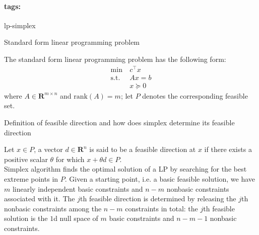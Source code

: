 \documentclass[11pt]{article}
\newcommand{\reals}{\mathbf{R}}
\newcommand*{\tags}[1]{\paragraph{tags: }#1\bigskip}
\newcommand*{\xfield}[1]{\begin{mdframed}\centering #1\end{mdframed}\bigskip}
\newenvironment{field}{}{}
\newenvironment{note}{}{}
\begin{document}
\tags{lp-simplex}
\begin{note}
  \xfield{Standard form linear programming problem}
  \begin{field}
    The standard form linear programming problem has the following
    form:
    \begin{align*}
      \min ~ & c^\top x \\
      \text{s.t.} ~ & Ax = b \\
      & x \succeq 0
    \end{align*}
    where \(A \in \reals^{m \times n}\) and \(\text{rank}(A) = m\);
    let \(P\) denotes the corresponding feasible set.
  \end{field}
\end{note}
%
\begin{note}
  \xfield{Definition of feasible direction and how does simplex
    determine its feasible direction}
  \begin{field}
    Let \(x \in P\), a vector \(d \in \reals^n\) is said to be a
    feasible direction at \(x\) if there exists a positive scalar
    \(\theta\) for which \(x + \theta d \in P\).
    \\

    Simplex algorithm finds the optimal solution of a LP by searching
    for the best extreme points in \(P\). Given a starting point,
    i.e. a basic feasible solution, we have \(m\) linearly independent
    basic constraints and \(n - m\) nonbasic constraints associated
    with it. The \(j\)th feasible direction is determined by releasing
    the \(j\)th nonbasic constraints among the \(n-m\) constraints in
    total: the \(j\)th feasible solution is the \(1\)d null space of
    \(m\) basic constraints and \(n-m-1\) nonbasic constraints.
  \end{field}
\end{note}
%
\end{document}
